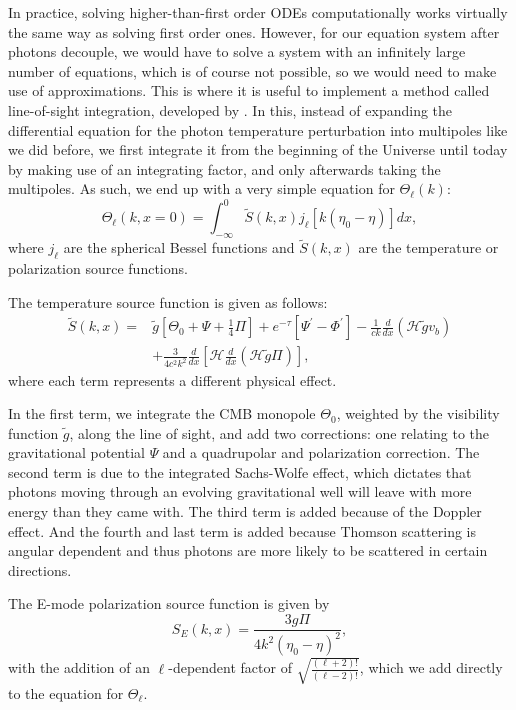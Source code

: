 \documentclass{aa}
\begin{document}
In practice, solving higher-than-first order ODEs computationally works virtually the same way as solving first order ones. However, for our equation system after photons decouple, we would have to solve a system with an infinitely large number of equations, which is of course not possible, so we would need to make use of approximations. This is where it is useful to implement a method called line-of-sight integration, developed by \citeauthor{1996ApJ...469..437S}. In this, instead of expanding the differential equation for the photon temperature perturbation into multipoles like we did before, we first integrate it from the beginning of the Universe until today by making use of an integrating factor, and only afterwards taking the multipoles. As such, we end up with a very simple equation for $\Theta_\ell(k)$:
\begin{equation}
\Theta_\ell(k, x=0) = \int_{-\infty}^{0} \tilde{S}(k,x) j_\ell[k(\eta_0-\eta)] dx,
\end{equation}
where $j_\ell$ are the spherical Bessel functions and $\tilde{S}(k,x)$ are the temperature or polarization source functions.

The temperature source function is given as follows:
\begin{align}
\tilde{S}(k,x) =& \tilde{g}\left[ \Theta_0 + \Psi + \frac{1}{4}\Pi\right] + e^{-\tau} \left[\Psi^\prime-\Phi^\prime\right] -
\frac{1}{ck}\frac{d}{dx}(\mathcal{H}\tilde{g}v_b) \nonumber\\&+ \frac{3}{4c^2k^2} \frac{d}{dx}
\left[\mathcal{H}\frac{d}{dx} (\mathcal{H}\tilde{g}\Pi)\right],
\end{align}
where each term represents a different physical effect.

In the first term, we integrate the CMB monopole $\Theta_0$, weighted by the visibility function $\tilde g$, along the line of sight, and add two corrections: one relating to the gravitational potential $\Psi$ and a quadrupolar and polarization correction. The second term is due to the integrated Sachs-Wolfe effect, which dictates that photons moving through an evolving gravitational well will leave with more energy than they came with. The third term is added because of the Doppler effect. And the fourth and last term is added because Thomson scattering is angular dependent and thus photons are more likely to be scattered in certain directions.

The E-mode polarization source function is given by
\begin{equation}
S_E(k,x) = \frac{3g\Pi}{4k^2(\eta_0-\eta)^2},
\end{equation}
with the addition of an $\ell$-dependent factor of $
\sqrt{\frac{(\ell+2)!}{(\ell-2)!}}$, which we add directly to the equation for $\Theta_\ell$.
\end{document}
